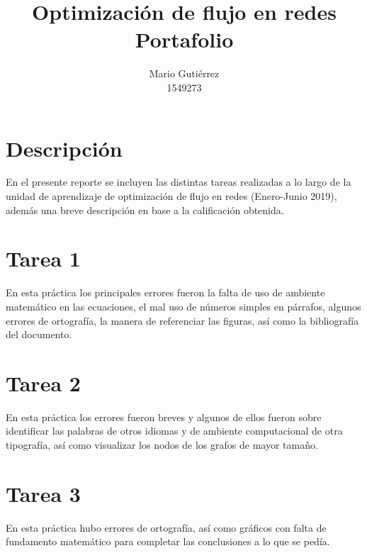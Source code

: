 \documentclass[11pt,a4paper]{article}
\author{Mario Gutiérrez \\ 1549273}
\title{Optimización de flujo en redes\\ 
\textbf{Portafolio}}
\begin{document}
\maketitle 

\setlength{\parindent}{0cm}

\section*{Descripción}

En el presente reporte se incluyen las distintas tareas realizadas a lo largo de la unidad de aprendizaje de optimización de flujo en redes (Enero-Junio 2019), además una breve descripción en base a la calificación obtenida.


\newpage

\section*{Tarea 1}

En esta práctica los principales errores fueron la falta de uso de ambiente matemático en las ecuaciones, el mal uso de números simples en párrafos, algunos errores de ortografía, la manera de referenciar las figuras, así como la bibliografía del documento.

\newpage


\section*{Tarea 2}

En esta práctica los errores fueron breves y algunos de ellos fueron sobre identificar las palabras de otros idiomas y de ambiente computacional de otra tipografía, así como visualizar los nodos de los grafos de mayor tamaño.

\newpage


\section*{Tarea 3}

En esta práctica hubo errores de ortografía, así como gráficos con falta de fundamento matemático para completar las conclusiones a lo que se pedía. 
\end{document}
